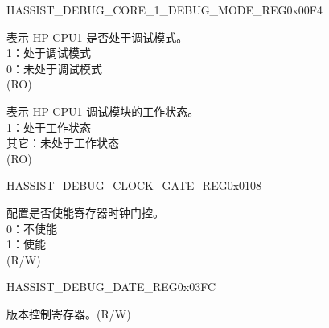 \begin{register}{H}{ASSIST\_DEBUG\_CORE\_1\_DEBUG\_MODE\_REG}{0x00F4}\label{regdesc:ASSISTDEBUGCORE1DEBUGMODEREG}
%
%
%
\regnewline%
\begin{regdesc}\begin{reglist}
\label{fielddesc:ASSISTDEBUGCORE1DEBUGMODE}\item [ASSIST\_DEBUG\_CORE\_1\_DEBUG\_MODE] 表示 HP CPU1 是否处于调试模式。\\
1：处于调试模式\\
0：未处于调试模式\\
(RO)
\label{fielddesc:ASSISTDEBUGCORE1DEBUGMODULEACTIVE}\item [ASSIST\_DEBUG\_CORE\_1\_DEBUG\_MODULE\_ACTIVE] 表示 HP CPU1 调试模块的工作状态。\\
1：处于工作状态\\
其它：未处于工作状态\\
(RO)
\end{reglist}\end{regdesc}
\end{register}


\begin{register}{H}{ASSIST\_DEBUG\_CLOCK\_GATE\_REG}{0x0108}\label{regdesc:ASSISTDEBUGCLOCKGATEREG}
%
%
\regnewline%
\begin{regdesc}\begin{reglist}
\label{fielddesc:ASSISTDEBUGCLKEN}\item [ASSIST\_DEBUG\_CLK\_EN] 配置是否使能寄存器时钟门控。\\
0：不使能\\
1：使能\\
(R/W)
\end{reglist}\end{regdesc}
\end{register}


\begin{register}{H}{ASSIST\_DEBUG\_DATE\_REG}{0x03FC}\label{regdesc:ASSISTDEBUGDATEREG}
%
%
\regnewline%
\begin{regdesc}\begin{reglist}
\label{fielddesc:ASSISTDEBUGDATE}\item [ASSIST\_DEBUG\_DATE] 版本控制寄存器。(R/W)
\end{reglist}\end{regdesc}
\end{register}


